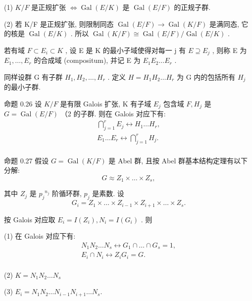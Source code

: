 \documentclass[]{article}
\begin{document}
{(1) $K / F$ 是正规扩张 $\Leftrightarrow \operatorname { G a l } ( E / K )$ 是 $\operatorname { G a l } ( E / F )$ 的正规子群. 

(2) 若 K/F 是正规扩张, 则限制同态 $\operatorname { G a l } ( E / F ) \to \operatorname { G a l } ( K / F )$ 是满同态, 它的核是 $\operatorname { G a l } ( E / K )$ . 所以 $\operatorname { G a l } ( K / F ) \cong \operatorname { G a l } ( E / F ) / \operatorname { G a l } ( E / K )$ . 

若有域 $F \subset E _ { i } \subset K$ , 设 E 是 K 的最小子域使得对每一 j 有 $E \supseteq E _ { j }$ , 则称 E 为 $E _ { 1 } , \ldots , E _ { r }$ 的合成域 (compositum), 并记 E 为 $E _ { 1 } E _ { 2 } \ldots E _ { r }$ . 

同样设群 G 有子群 $H _ { 1 } , H _ { 2 } , \ldots , H _ { r }$ . 定义 $H = H _ { 1 } H _ { 2 } \dots H _ { r }$ 为 G 内的包括所有 $H _ { j }$ 的最小子群. 

命题 0.26 设 $K / F$ 是有限 Galois 扩张, K 有子域 $E _ { j }$ 包含域 $F , H _ { j }$ 是 $G = \operatorname { G a l } ( E / F )$ （2 的子群. 则在 Galois 对应下有: $$
\begin{array}{l} \bigcap_ {j = 1} ^ {r} E _ {j} \leftrightarrow H _ {1} \dots H _ {r}, \\ E _ {1} \dots E _ {r} \leftrightarrow \bigcap_ {j = 1} ^ {r} H _ {j}. \\ \end{array}
$$

命题 0.27 假设 $G = \operatorname { G a l } ( K / F )$ 是 Abel 群, 且按 Abel 群基本结构定理有以下分解:$$
G \approx Z _ {1} \times \dots \times Z _ {s},
$$

其中 $Z _ { j }$ 是 ${ p _ { j } } ^ { n _ { j } }$ 阶循环群, $p _ { j }$ 是素数. 设 $$
G _ {i} = Z _ {1} \times \dots \times Z _ {i - 1} \times Z _ {i + 1} \times \dots \times Z _ {s}.
$$

按 Galois 对应取 $E _ { i } = I ( Z _ { i } ) , N _ { i } = I ( G _ { i } )$ . 则 

(1) 在 Galois 对应下有:$$
\begin{array}{l} N _ {1} N _ {2} \dots N _ {s} \leftrightarrow G _ {1} \cap \dots \cap G _ {s} = 1, \\ E _ {i} \cap N _ {i} \leftrightarrow Z _ {i} G _ {i} = G. \\ \end{array}
$$  

(2) $K = N _ { 1 } N _ { 2 } \dots N _ { s }$ 

(3) $E _ { i } = N _ { 1 } N _ { 2 } \dots N _ { i - 1 } N _ { i + 1 } \dots N _ { s } .$ 

}
\end{document}
